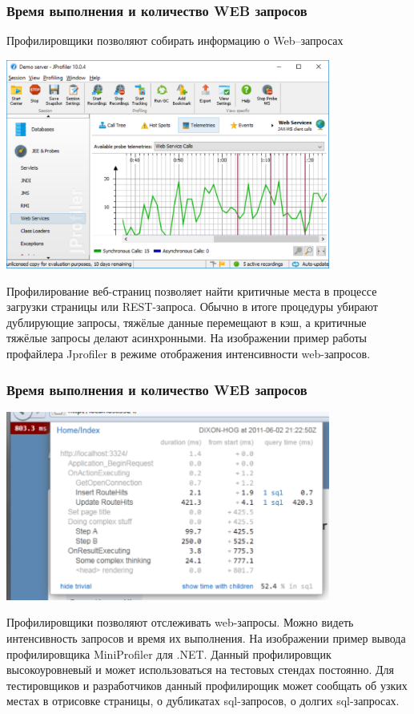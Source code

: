 \documentclass{../industrial-development}
\begin{document}
\begin{frame} \frametitle{Время выполнения и количество WEB запросов}
	\begin{block}{}
		Профилировщики позволяют \alert{собирать информацию о Web--запросах}
	\end{block}
	\centerline{\includegraphics[width=0.8\textwidth]{webservices.pdf}}
\end{frame}
\lecturenotes
Профилирование веб-страниц позволяет найти критичные места в процессе загрузки страницы или REST-запроса. Обычно в итоге процедуры убирают дублирующие запросы, тяжёлые данные перемещают в кэш, а критичные тяжёлые запросы делают асинхронными. На изображении пример работы профайлера Jprofiler в режиме отображения интенсивности web-запросов.

\begin{frame} \frametitle{Время выполнения и количество WEB запросов}
	\centerline{\includegraphics[width=0.8\textwidth]{miniprofiler1.pdf}}
\end{frame}
\lecturenotes
Профилировщики позволяют отслеживать web-запросы. Можно видеть интенсивность запросов и время их выполнения. На изображении пример вывода профилировщика MiniProfiler для .NET. Данный профилировщик высокоуровневый и может использоваться на тестовых стендах постоянно. Для тестировщиков и разработчиков данный профилирощик может сообщать об узких местах в отрисовке страницы, о дубликатах sql-запросов, о долгих sql-запросах.
\end{document}
